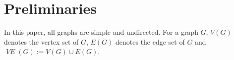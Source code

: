 \documentclass{patmorin}
\DeclareMathOperator{\VE}{\mathit{VE}}
\begin{document}
\section{Preliminaries}



In this paper, all graphs are simple and undirected. For a graph $G$, $V(G)$ denotes the vertex set of $G$, $E(G)$ denotes the edge set of $G$ and $\VE(G):=V(G)\cup E(G)$.



\end{document}

